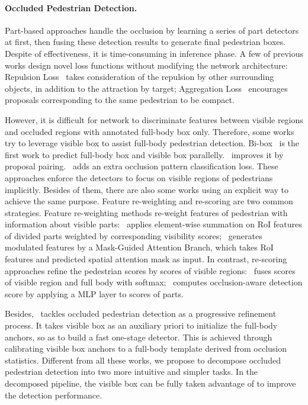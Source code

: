 \documentclass[10pt,twocolumn,letterpaper]{article}
\begin{document}
\paragraph{Occluded Pedestrian Detection.}
Part-based approaches handle the occlusion by learning a series of part detectors at first, then fusing these detection results to generate final pedestrian boxes. Despite of effectiveness, it is time-consuming in inference phase. A few of previous works design novel loss functions without modifying the network architecture: Repulsion Loss~\cite{wang2018repulsion} takes consideration of the repulsion by other surrounding objects, in addition to the attraction by target; Aggregation Loss~\cite{zhang2018Occlusionaware} encourages proposals corresponding to the same pedestrian to be compact.

However, it is difficult for network to discriminate features between visible regions and occluded regions with annotated full-body box only. Therefore, some works try to leverage visible box to assist full-body pedestrian detection. Bi-box~\cite{Zhou_2018_bibox} is the first work to predict full-body box and visible box parallelly.~\cite{huang2020R2nms} improves it by proposal pairing.~\cite{zhang2018occludedattention} adds an extra occlusion pattern classification loss. These approaches enforce the detectors to focus on visible regions of pedestrians implicitly. Besides of them, there are also some works using an explicit way to achieve the same purpose. Feature re-weighting and re-scoring are two common strategies. Feature re-weighting methods re-weight features of pedestrian with information about visible parts:~\cite{zhang2018Occlusionaware} applies element-wise summation on RoI features of divided parts weighted by corresponding visibility scores;~\cite{pang2019mask} generates modulated features by a Mask-Guided Attention Branch, which takes RoI features and predicted spatial attention mask as input. In contrast, re-scoring approaches refine the pedestrian scores by scores of visible regions:~\cite{Zhou_2018_bibox} fuses scores of visible region and full body with softmax;~\cite{Noh_2018_CVPR} computes occlusion-aware detection score by applying a MLP layer to scores of parts.

Besides,~\cite{prnet} tackles occluded pedestrian detection as a progressive refinement process. It takes visible box as an auxiliary priori to initialize the full-body anchors, so as to build a fast one-stage detector. This is achieved through calibrating visible box anchors to a full-body template derived from occlusion statistics. Different from all these works, we propose to decompose occluded pedestrian detection into two more intuitive and simpler tasks. In the decomposed pipeline, the visible box can be fully taken advantage of to improve the detection performance.
\end{document}

